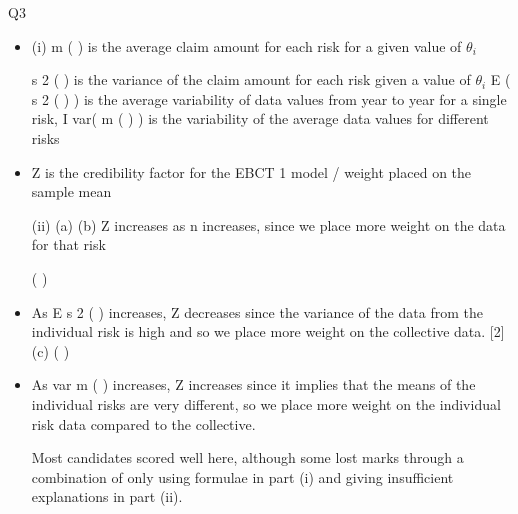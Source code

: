 \documentclass[a4paper,12pt]{article}
\begin{document}
\newpage
Q3
\begin{itemize}
    \item 

(i)
m ( \theta ) is the average claim amount for each risk for a given value of $\theta_i$

s 2 ( \theta ) is the variance of the claim amount for each risk given a value of $\theta_i$
E ( s 2 ( \theta ) ) is the average variability of data values from year to year for a single
risk, I 
var( m ( \theta ) ) is the variability of the average data values for different risks 
\item Z is the credibility factor for the EBCT 1 model / weight placed on the sample
mean

(ii)
(a)
(b)
Z increases as n increases, since we place more weight on the data for
that risk

(
)
\item As E s 2 ( \theta ) increases, Z decreases since the variance of the data
from the individual risk is high and so we place more weight on the
collective data.
[2]
(c)
(
)
\item As var m ( \theta ) increases, Z increases since it implies that the means of
the individual risks are very different, so we place more weight on the
individual risk data compared to the collective.

Most candidates scored well here, although some lost marks through a
combination of only using formulae in part (i) and giving insufficient
explanations in part (ii).
\end{itemize}
\end{document}
